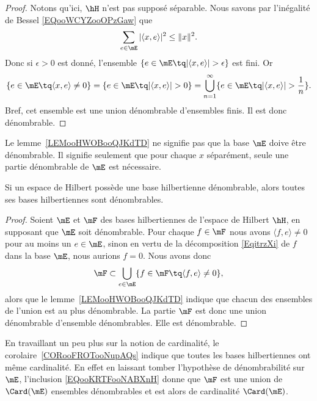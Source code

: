 \begin{proof}
	Notons qu'ici, \( \hH\) n'est pas supposé séparable. Nous savons par l'inégalité de Bessel \eqref{EQooWCYZooOPzGaw} que
	\begin{equation}
		\sum_{e\in\mE}| \langle x, e\rangle  |^2\leq \| x \|^2.
	\end{equation}
	Donc si \( \epsilon>0\) est donné, l'ensemble \( \{ e\in \mE\tq| \langle x, e\rangle  |>\epsilon \}\) est fini. Or
	\begin{equation}
		\{ e\in\mE\tq \langle x, e\rangle \neq 0  \}=\{ e\in\mE\tq| \langle x, e\rangle  |>0 \}=\bigcup_{n=1}^{\infty}\{ e\in\mE\tq | \langle x, e\rangle  |>\frac{1}{ n } \}.
	\end{equation}
	Bref, cet ensemble est une union dénombrable d'ensembles finis. Il est donc dénombrable.
\end{proof}

\begin{remark}
	Le lemme~\ref{LEMooHWOBooQJKdTD} ne signifie pas que la base \( \mE\) doive être dénombrable. Il signifie seulement que pour chaque \( x\) séparément, seule une partie dénombrable de \( \mE\) est nécessaire.
\end{remark}

\begin{corollary}       \label{CORooFROTooNupAQs}
	Si un espace de Hilbert possède une base hilbertienne dénombrable, alors toutes ses bases hilbertiennes sont dénombrables.
\end{corollary}

\begin{proof}
	Soient \( \mE\) et \( \mF\) des bases hilbertiennes de l'espace de Hilbert \( \hH\), en supposant que \( \mE\) soit dénombrable. Pour chaque \( f\in \mF\) nous avons \( \langle f, e\rangle \neq 0\) pour au moins un \( e\in\mE\), sinon en vertu de la décomposition \eqref{EqitrzXi} de \( f\) dans la base \( \mE\), nous aurions \( f=0\). Nous avons donc
	\begin{equation}    \label{EQooKRTFooNABXnH}
		\mF\subset\bigcup_{e\in \mE}\{ f\in\mF\tq \langle f, e\rangle \neq 0 \},
	\end{equation}
	alors que le lemme~\ref{LEMooHWOBooQJKdTD} indique que chacun des ensembles de l'union est au plus dénombrable. La partie \( \mF\) est donc une union dénombrable d'ensemble dénombrables. Elle est dénombrable.
\end{proof}

\begin{remark}
	En travaillant un peu plus sur la notion de cardinalité, le corolaire~\ref{CORooFROTooNupAQs} indique que toutes les bases hilbertiennes ont même cardinalité. En effet en laissant tomber l'hypothèse de dénombrabilité sur \( \mE\), l'inclusion \eqref{EQooKRTFooNABXnH} donne que \( \mF\) est une union de \( \Card(\mE)\) ensembles dénombrables et est alors de cardinalité \( \Card(\mE)\).
\end{remark}

